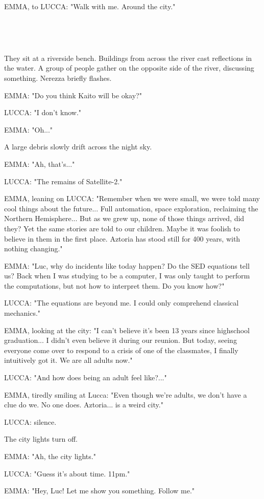 \documentclass[11pt]{article}
\begin{document}
EMMA, to LUCCA: "Walk with me. Around the city."

\ 

\ 

They sit at a riverside bench.
Buildings from across the river cast reflections in the water.
A group of people gather on the opposite side of the river, discussing something.
Nerezza briefly flashes.

EMMA: "Do you think Kaito will be okay?"

LUCCA: "I don't know."

EMMA: "Oh..."

A large debris slowly drift across the night sky.

EMMA: "Ah, that's..."

LUCCA: "The remains of Satellite-2."

EMMA, leaning on LUCCA: "Remember when we were small, we were told many cool things about the future...
Full automation, space exploration, reclaiming the Northern Hemisphere...
But as we grew up, none of those things arrived, did they?
Yet the same stories are told to our children.
Maybe it was foolish to believe in them in the first place.
Aztoria has stood still for 400 years, with nothing changing."

EMMA: "Luc, why do incidents like today happen?
Do the SED equations tell us?
Back when I was studying to be a computer, I was only taught to perform the computations, but not how to interpret them.
Do you know how?"

LUCCA: "The equations are beyond me.
I could only comprehend classical mechanics."

EMMA, looking at the city: "I can't believe it's been 13 years since highschool graduation...
I didn't even believe it during our reunion.
But today, seeing everyone come over to respond to a crisis of one of the classmates, I finally intuitively got it.
We are all adults now."

LUCCA: "And how does being an adult feel like?..."

EMMA, tiredly smiling at Lucca: "Even though we're adults, we don't have a clue do we. 
No one does.
Aztoria... is a weird city."

LUCCA: silence.

The city lights turn off.

EMMA: "Ah, the city lights."

LUCCA: "Guess it's about time. 11pm."

EMMA: "Hey, Luc! Let me show you something. Follow me."
\end{document}
